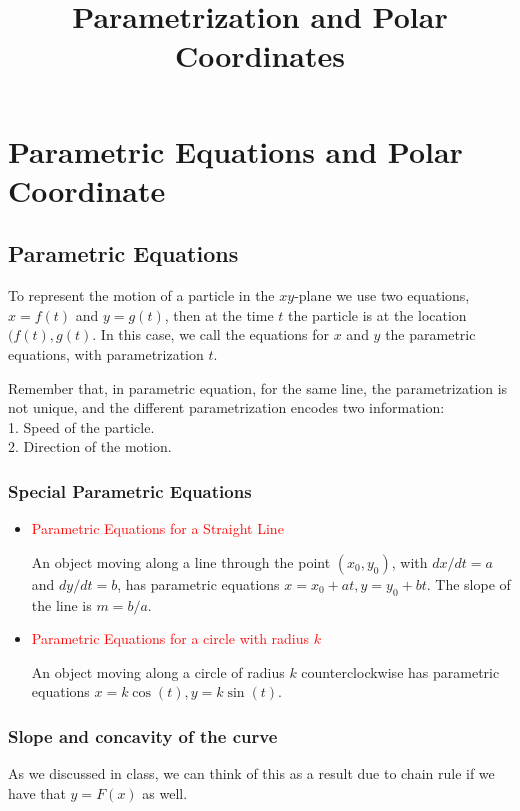 \documentclass[12pt]{article}
\date{}
\title{Parametrization and Polar Coordinates}
\theoremstyle{definition}
\theoremstyle{definition}
\theoremstyle{remark}
\theoremstyle{definition}
\theoremstyle{definition}
\theoremstyle{definition}
\begin{document}
\maketitle
\section{Parametric Equations and Polar Coordinate}
\subsection{Parametric Equations}
To represent the motion of a particle in the $xy$-plane we use two equations, $x=f(t)$ and $y=g(t)$, then at the time $t$ the particle is at the location $(f(t),g(t)$. In this case, we call the equations for $x$ and $y$ the parametric equations, with parametrization $t$.

Remember that, in parametric equation, for the same line, the parametrization is not unique, and the different parametrization encodes two information:\\
1. Speed of the particle.\\
2. Direction of the motion.\\

\subsubsection{Special Parametric Equations}

\begin{itemize}
\item \textcolor{red}{Parametric Equations for a Straight Line}

An object moving along a line through the point $(x_0, y_0)$, with $dx/dt = a$ and $dy/dt = b$,
has parametric equations
$x = x_0 + at, y = y_0 + bt$.
The slope of the line is $m = b/a$.
\item\textcolor{red}{Parametric Equations for a circle with radius $k$}

An object moving along a circle of radius $k$ counterclockwise has parametric equations
$x = k\cos(t), y = k\sin(t)$.
\end{itemize}


\subsubsection{Slope and concavity of the curve}
As we discussed in class, we can think of this as a result due to chain rule if we have that $y=F(x)$ as well. 
\end{document}
